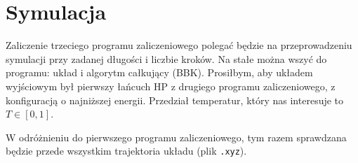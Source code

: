 \documentclass[a4paper,11pt,twoside]{book}
\begin{document}
\section{Symulacja}
Zaliczenie trzeciego programu zaliczeniowego polegać będzie na przeprowadzeniu symulacji przy zadanej długości i liczbie kroków.
Na stałe można wszyć do programu: układ i algorytm całkujący (BBK).
Prosiłbym, aby układem wyjściowym był pierwszy łańcuch HP z drugiego programu zaliczeniowego, z konfiguracją o najniższej energii.
Przedział temperatur, który nas interesuje to $T\in[0,1]$.

W odróżnieniu do pierwszego programu zaliczeniowego, tym razem sprawdzana będzie przede wszystkim trajektoria układu (plik {\tt .xyz}).



\end{document}
